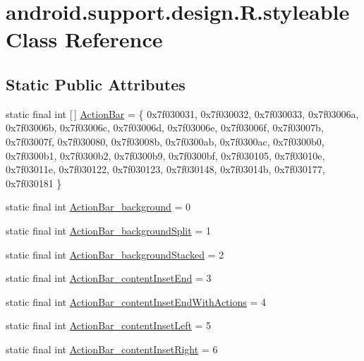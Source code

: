 \hypertarget{classandroid_1_1support_1_1design_1_1R_1_1styleable}{}\section{android.\+support.\+design.\+R.\+styleable Class Reference}
\label{classandroid_1_1support_1_1design_1_1R_1_1styleable}
\subsection*{Static Public Attributes}
\begin{DoxyCompactItemize}
\item 
static final int \mbox{[}$\,$\mbox{]} \mbox{\hyperlink{classandroid_1_1support_1_1design_1_1R_1_1styleable_ab795220a96557d11f8c21359b95bed82}{Action\+Bar}} = \{ 0x7f030031, 0x7f030032, 0x7f030033, 0x7f03006a, 0x7f03006b, 0x7f03006c, 0x7f03006d, 0x7f03006e, 0x7f03006f, 0x7f03007b, 0x7f03007f, 0x7f030080, 0x7f03008b, 0x7f0300ab, 0x7f0300ac, 0x7f0300b0, 0x7f0300b1, 0x7f0300b2, 0x7f0300b9, 0x7f0300bf, 0x7f030105, 0x7f03010e, 0x7f03011e, 0x7f030122, 0x7f030123, 0x7f030148, 0x7f03014b, 0x7f030177, 0x7f030181 \}
\item 
static final int \mbox{\hyperlink{classandroid_1_1support_1_1design_1_1R_1_1styleable_a2d07ba50bce7e11b3a849eefb51eb7ea}{Action\+Bar\+\_\+background}} = 0
\item 
static final int \mbox{\hyperlink{classandroid_1_1support_1_1design_1_1R_1_1styleable_aec14d1bbeebc0fe7cc5a60a04240dccf}{Action\+Bar\+\_\+background\+Split}} = 1
\item 
static final int \mbox{\hyperlink{classandroid_1_1support_1_1design_1_1R_1_1styleable_a857cc7859cd2386270589f5e83e44ec9}{Action\+Bar\+\_\+background\+Stacked}} = 2
\item 
static final int \mbox{\hyperlink{classandroid_1_1support_1_1design_1_1R_1_1styleable_a6e5dec3264d2013081f33097dd95df80}{Action\+Bar\+\_\+content\+Inset\+End}} = 3
\item 
static final int \mbox{\hyperlink{classandroid_1_1support_1_1design_1_1R_1_1styleable_a69a3151064bcf0934094828650e73329}{Action\+Bar\+\_\+content\+Inset\+End\+With\+Actions}} = 4
\item 
static final int \mbox{\hyperlink{classandroid_1_1support_1_1design_1_1R_1_1styleable_a1aa24ac28fc59081ffcafe4bd8999986}{Action\+Bar\+\_\+content\+Inset\+Left}} = 5
\item 
static final int \mbox{\hyperlink{classandroid_1_1support_1_1design_1_1R_1_1styleable_a50cd81e727da00403b885bd981f5aac9}{Action\+Bar\+\_\+content\+Inset\+Right}} = 6

\end{DoxyCompactItemize}
